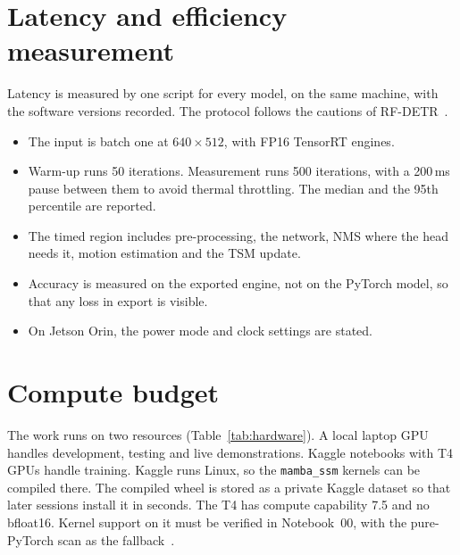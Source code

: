 \section{Latency and efficiency measurement}
\label{sec:latency}

Latency is measured by one script for every model, on the same machine, with
the software versions recorded. The protocol follows the cautions of
RF-DETR~\citep{robinson2025rfdetr}.
\begin{itemize}
  \item The input is batch one at $640\times512$, with FP16 TensorRT engines.
  \item Warm-up runs 50 iterations. Measurement runs 500 iterations, with a
        200\,ms pause between them to avoid thermal throttling. The median
        and the 95th percentile are reported.
  \item The timed region includes pre-processing, the network, NMS where the
        head needs it, motion estimation and the TSM update.
  \item Accuracy is measured on the exported engine, not on the PyTorch
        model, so that any loss in export is visible.
  \item On Jetson Orin, the power mode and clock settings are stated.
\end{itemize}

\section{Compute budget}
\label{sec:compute}

The work runs on two resources (Table~\ref{tab:hardware}). A local laptop
GPU handles development, testing and live demonstrations. Kaggle notebooks
with T4 GPUs handle training. Kaggle runs Linux, so the \texttt{mamba\_ssm}
kernels can be compiled there. The compiled wheel is stored as a private
Kaggle dataset so that later sessions install it in seconds. The T4 has
compute capability 7.5 and no bfloat16. Kernel support on it must be
verified in Notebook~00, with the pure-PyTorch scan as the
fallback~\citep{mambapy_repo}.

